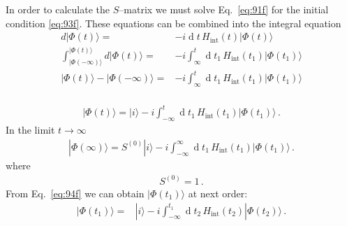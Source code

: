 In order to calculate the $S$--matrix we must solve Eq.~\eqref{eq:91f} for the initial condition \eqref{eq:93f}. These equations can be combined into the integral equation
\begin{align}
 d |\Phi(t)\rangle=&-i \operatorname{d}t\,H_{\text{int}}(t)|\Phi(t)\rangle\nonumber\\
\int_{|\Phi(-\infty)\rangle}^{|\Phi(t)\rangle} d |\Phi(t)\rangle=&-i \int_\infty^t \operatorname{d}t_1\,H_{\text{int}}(t_1)|\Phi(t_1)\rangle\nonumber\\
|\Phi(t)\rangle-|\Phi(-\infty)\rangle=&-i \int_\infty^t \operatorname{d}t_1\,H_{\text{int}}(t_1)|\Phi(t_1)\rangle\nonumber\\
\end{align}
\begin{frame}

\begin{align}
\label{eq:94f}
  |\Phi(t)\rangle=|i\rangle-i\int_{-\infty}^t \operatorname{d}t_1\,H_{\text{int}}(t_1)|\Phi(t_1)\rangle\,.
\end{align}
In the limit $t\to\infty$
\begin{align}
  |\Phi(\infty)\rangle=S^{(0)}|i\rangle-i\int_{-\infty}^\infty \operatorname{d}t_1\,H_{\text{int}}(t_1)|\Phi(t_1)\rangle\,.
\end{align}
where 
\begin{align}
  S^{(0)}=1\,.
\end{align}
From Eq.~\eqref{eq:94f} we can obtain $|\Phi(t_1)\rangle$ at next order:
\begin{align}
  |\Phi(t_1)\rangle=&|i\rangle-i\int_{-\infty}^{t_1} \operatorname{d}t_2\,H_{\text{int}}(t_2)|\Phi(t_2)\rangle\,.
\end{align}
\end{frame}

